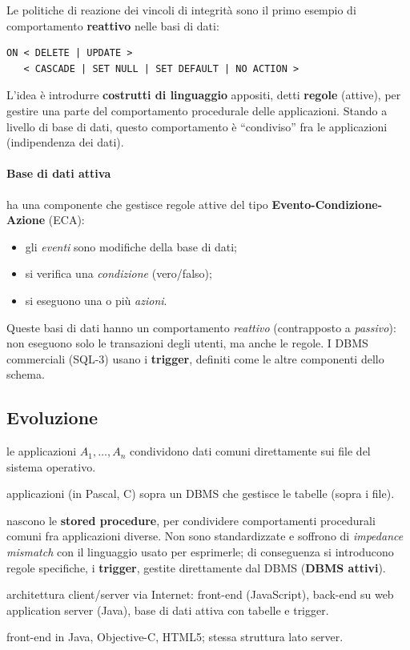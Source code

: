 \documentclass[a4paper,12pt]{article}
\begin{document}
Le politiche di reazione dei vincoli di integrità sono il primo esempio di
comportamento \textbf{reattivo} nelle basi di dati:
\begin{verbatim}
ON < DELETE | UPDATE >
   < CASCADE | SET NULL | SET DEFAULT | NO ACTION >
\end{verbatim}
L'idea è introdurre \textbf{costrutti di linguaggio} appositi, detti
\textbf{regole} (attive), per gestire una parte del comportamento procedurale
delle applicazioni. Stando a livello di base di dati, questo comportamento è
``condiviso'' fra le applicazioni (indipendenza dei dati).

\paragraph{Base di dati attiva} ha una componente che gestisce regole attive
del tipo \textbf{Evento-Condizione-Azione} (ECA):
\begin{itemize}
  \item gli \emph{eventi} sono modifiche della base di dati;
  \item si verifica una \emph{condizione} (vero/falso);
  \item si eseguono una o più \emph{azioni}.
\end{itemize}
Queste basi di dati hanno un comportamento \emph{reattivo} (contrapposto a
\emph{passivo}): non eseguono solo le transazioni degli utenti, ma anche le
regole. I DBMS commerciali (SQL-3) usano i \textbf{trigger}, definiti come le
altre componenti dello schema.

\subsection{Evoluzione}

\begin{description}[style=nextline]
  \item[Anni '70: niente DBMS] le applicazioni $A_1, \dots, A_n$ condividono
    dati comuni direttamente sui file del sistema operativo.
  \item[Anni '80: primi DBMS] applicazioni (in Pascal, C) sopra un DBMS che
    gestisce le tabelle (sopra i file).
  \item[Anni '90: comportamento procedurale condiviso] nascono le
    \textbf{stored procedure}, per condividere comportamenti procedurali
    comuni fra applicazioni diverse. Non sono standardizzate e soffrono di
    \emph{impedance mismatch} con il linguaggio usato per esprimerle; di
    conseguenza si introducono regole specifiche, i \textbf{trigger}, gestite
    direttamente dal DBMS (\textbf{DBMS attivi}).
  \item[Anni 2000] architettura client/server via Internet: front-end
    (JavaScript), back-end su web application server (Java), base di dati
    attiva con tabelle e trigger.
  \item[Anni 2010: app mobili] front-end in Java, Objective-C, HTML5; stessa
    struttura lato server.
\end{description}
\end{document}

